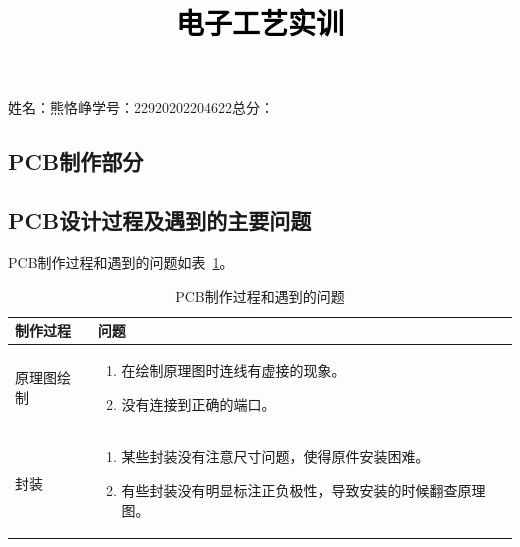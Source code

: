 \documentclass[a4paper,twoside,zihao=5,UTF8]{ctexart}
\newcommand{\StudentNumber}{22920202204622}  %
\newcommand{\StudentName}{熊恪峥}  %
\newcommand{\PaperTitle}{电子工艺实训}  %
\begin{document}
\newpage

\title{
	\Large{\textcolor{black}{\PaperTitle}}
}
	
	
\maketitle

\begin{center}
	姓名：\StudentName \qquad 学号：\StudentNumber \qquad 总分：
\end{center}
	
\tableofcontents
 
\newpage
\setcounter{page}{1}

\begin{spacing}{1.2}

\section{PCB制作部分}

\subsection{PCB设计过程及遇到的主要问题}

PCB制作过程和遇到的问题如表~\ref{tbl:pcb}。

\begin{table}[htbp]
	\renewcommand\arraystretch{1.5}
	\centering
	\caption{PCB制作过程和遇到的问题}
	\label{tbl:pcb}
	\begin{tabular}{p{4cm}|p{8cm}}
		\toprule
		\hline
		制作过程 & 问题 \\
		\hline
		原理图绘制 & \begin{minipage}[t]{8cm}
			\begin{enumerate}
				\item 在绘制原理图时连线有虚接的现象。
				\item 没有连接到正确的端口。
			\end{enumerate}
		\end{minipage} 
		
		\\
		\hline
		封装 & \begin{minipage}[t]{8cm}
			\begin{enumerate}
				\item 某些封装没有注意尺寸问题，使得原件安装困难。
				\item 有些封装没有明显标注正负极性，导致安装的时候翻查原理图。
			\end{enumerate}
		\end{minipage} 
		

\end{tabular}
\end{table}
\end{spacing}
\end{document}
